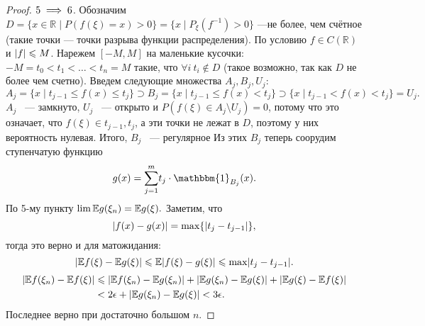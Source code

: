 \begin{proof}
     $5\implies 6$. Обозначим $D = \{x\in\mathbb{R}\mid P(f(\xi) = x) > 0\} = \{x\mid P_\xi(f^{-1}) > 0\}$ ---не более, чем счётное (такие точки --- точки разрыва функции распределения).
    По условию $f\in C(\mathbb{R})$ и $\lvert f\rvert\leqslant M$. Нарежем $[-M, M]$ на маленькие кусочки: $-M = t_0 < t_1 < \ldots < t_n = M$ такие, что $\forall i \ t_i \notin D$ (такое возможно, так как $D$ не более чем счетно).
     Введем следующие множества $A_j, B_j, U_j$:
     $$A_j = \{x\mid t_{j - 1}\le f(x) \le t_j\}\supset B_j = \{x\mid t_{j - 1}\le f(x) < t_j\} \supset \{x\mid t_{j - 1}< f(x) < t_j\} =  U _j.$$
     $A_j$ ~--- замкнуто, $ U _j$ ~--- открыто и $P(f(\xi)\in A_j\setminus  U _j) = 0$, потому что это означает, что $f(\xi)\in {t_{j - 1}, t_j}$, а эти точки не лежат в $D$, поэтому у них вероятность нулевая. Итого, $B_j$ ~--- регулярное
     Из этих $B_j$ теперь соорудим ступенчатую функцию 
     $$g(x)= \overset{m}{\underset{j = 1}{\sum}} t_j\cdot\mathbbm{1}_{B_j}(x).$$
    По 5-му пункту $\lim \mathbb{E} g(\xi_n) = \mathbb{E} g(\xi).$
    Заметим, что
       $$ \lvert f(x) - g(x)\rvert = \max\{\lvert t_j - t_{j - 1}\rvert\}, $$
       тогда это верно и для матожидания:
       $$\lvert\mathbb{E} f(\xi) - \mathbb{E} g(\xi)\rvert\leqslant \mathbb{E} \lvert f(\xi) - g(\xi)\rvert\leqslant \max \lvert t_j - t_{j - 1}\rvert.$$
        \begin{align*}
        \lvert\mathbb{E} f(\xi_n) - \mathbb{E} f(\xi)\rvert &\leqslant \lvert\mathbb{E} f(\xi_n) - \mathbb{E} g(\xi_n)\rvert + \lvert\mathbb{E} g(\xi_n) - \mathbb{E} g(\xi)\rvert + \lvert\mathbb{E} g(\xi) - \mathbb{E} f(\xi)\rvert \\&< 2 \epsilon + \lvert\mathbb{E} g(\xi_n) - \mathbb{E} g(\xi)\rvert < 3 \epsilon.
    \end{align*}
     Последнее верно при достаточно большом $n$. 
 \end{proof}\newpage
